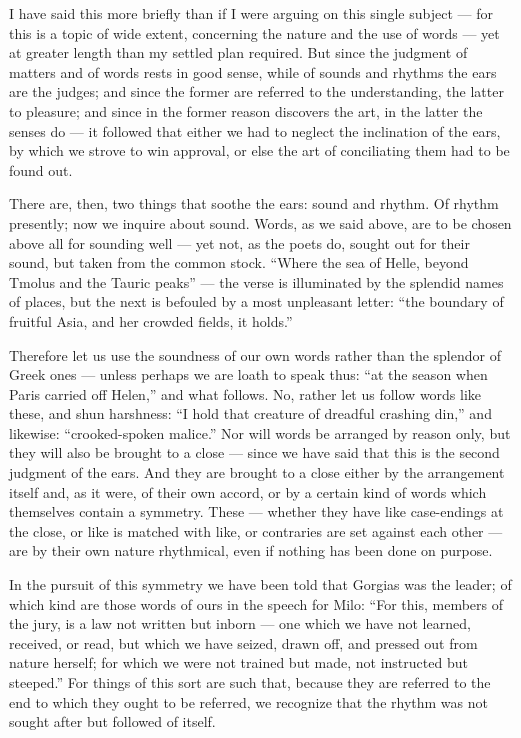  I have said this more briefly than if I were arguing on this single subject — for this is a topic of wide extent, concerning the nature and the use of words — yet at greater length than my settled plan required. But since the judgment of matters and of words rests in good sense, while of sounds and rhythms the ears are the judges; and since the former are referred to the understanding, the latter to pleasure; and since in the former reason discovers the art, in the latter the senses do — it followed that either we had to neglect the inclination of the ears, by which we strove to win approval, or else the art of conciliating them had to be found out.

 There are, then, two things that soothe the ears: sound and rhythm. Of rhythm presently; now we inquire about sound. Words, as we said above, are to be chosen above all for sounding well — yet not, as the poets do, sought out for their sound, but taken from the common stock. ``Where the sea of Helle, beyond Tmolus and the Tauric peaks'' — the verse is illuminated by the splendid names of places, but the next is befouled by a most unpleasant letter: ``the boundary of fruitful Asia, and her crowded fields, it holds.''

 Therefore let us use the soundness of our own words rather than the splendor of Greek ones — unless perhaps we are loath to speak thus: ``at the season when Paris carried off Helen,'' and what follows. No, rather let us follow words like these, and shun harshness: ``I hold that creature of dreadful crashing din,'' and likewise: ``crooked-spoken malice.'' Nor will words be arranged by reason only, but they will also be brought to a close — since we have said that this is the second judgment of the ears. And they are brought to a close either by the arrangement itself and, as it were, of their own accord, or by a certain kind of words which themselves contain a symmetry. These — whether they have like case-endings at the close, or like is matched with like, or contraries are set against each other — are by their own nature rhythmical, even if nothing has been done on purpose.

 In the pursuit of this symmetry we have been told that Gorgias was the leader; of which kind are those words of ours in the speech for Milo: ``For this, members of the jury, is a law not written but inborn — one which we have not learned, received, or read, but which we have seized, drawn off, and pressed out from nature herself; for which we were not trained but made, not instructed but steeped.'' For things of this sort are such that, because they are referred to the end to which they ought to be referred, we recognize that the rhythm was not sought after but followed of itself.


